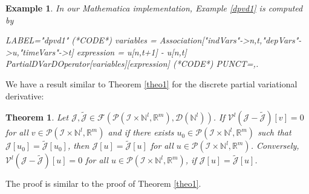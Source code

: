 \documentclass[manuscript]{acmart}
\newcommand{\Rr}{{\mathbb{R}}}
\newcommand{\Nn}{{\mathbb{N}}}
\newcommand{\1}{{\chi}}
\newcommand{\Ii}{{\mathcal{I}}}
\numberwithin{equation}{section}
\theoremstyle{thmlemcorr}
\numberwithin{theorem}{section}
\theoremstyle{thmlemcorr*}
\theoremstyle{defi}
\theoremstyle{remexample}
\newtheorem{example}[theorem]{Example}
\newtheorem{teo}[theorem]{Theorem}
\theoremstyle{ass}
\begin{document}
\begin{example}
	In our {\sc Mathematica} implementation, Example \ref{dpvd1} is computed by
	\begin{EXE}
		LABEL="dpvd1"
		(*CODE*)
		variables = Association["indVars"->{n,t},"depVars"->{u},"timeVars"->{t}]
		expression = u[n,t+1] - u[n,t]
		PartialDVarDOperator[variables][expression]
		(*CODE*)
		PUNCT={,.}
	\end{EXE}	
	\begin{small}
		
		
	\end{small}
\end{example}
We have a result similar to Theorem \ref{theo1} for the discrete partial variational derivative:
\begin{teo}\label{theo2}
	Let $\mathcal{J},\tilde{\mathcal{J}}\in \mathcal{F}(\mathcal{P}(\Ii\times\Nn^l,\Rr^m),\mathcal{D}(\Nn^l))$. If $\mathcal{V}^l(\mathcal{J}-\tilde{\mathcal{J}})[v]=0$ for all $v\in\mathcal{P}(\Ii\times\Nn^l,\Rr^m)$ and if there exists $u_0\in\mathcal{P}(\Ii\times\Nn^l,\Rr^m)$ such that $\mathcal{J}[u_0]=\tilde{\mathcal{J}}[u_0]$, then
		$\mathcal{J}[u]=\tilde{\mathcal{J}}[u]$
	for all $u\in\mathcal{P}(\Ii\times\Nn^l,\Rr^m)$.
	Conversely,
		$\mathcal{V}^l(\mathcal{J}-\tilde{\mathcal{J}})[u]=0$
	for all $u\in\mathcal{P}(\Ii\times\Nn^l,\Rr^m)$, if $\mathcal{J}[u]=\tilde{\mathcal{J}}[u]$.
\end{teo}
The proof is similar to the proof of Theorem \ref{theo1}.
\end{document}

